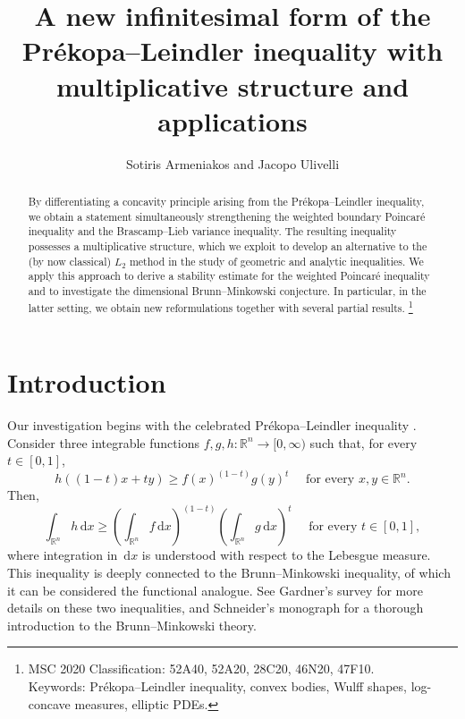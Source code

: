 \documentclass[a4paper, 11pt]{article}
\title{A new infinitesimal form of the Pr\'ekopa--Leindler inequality with multiplicative structure and applications}
\author{Sotiris Armeniakos and Jacopo Ulivelli}
\date{}
\newcommand{\R}{\mathbb{R}}
\theoremstyle{definition}
\newcommand{\di}{\, \mathrm{d}}
\newcommand\blfootnote[1]{%
	\begingroup
	\renewcommand\thefootnote{}\footnote{#1}%
	\addtocounter{footnote}{-1}%
	\endgroup
}
\begin{document}
	\maketitle
	
	\begin{abstract}
		By differentiating a concavity principle arising from the Prékopa--Leindler inequality, we obtain a statement simultaneously strengthening the weighted boundary Poincar\'e inequality and the Brascamp--Lieb variance inequality. The resulting inequality possesses a multiplicative structure, which we exploit to develop an alternative to the (by now classical) $L_2$ method in the study of geometric and analytic inequalities. We apply this approach to derive a stability estimate for the weighted Poincar\'e inequality and to investigate the dimensional Brunn--Minkowski conjecture. In particular, in the latter setting, we obtain new reformulations together with several partial results.
		\blfootnote{
			MSC 2020 Classification: 52A40, 52A20, 28C20, 46N20, 47F10.\\
			Keywords: Pr\'ekopa--Leindler inequality, convex bodies, Wulff shapes, log-concave measures, elliptic PDEs.}
	\end{abstract}

\section{Introduction}

Our investigation begins with the celebrated Pr\'ekopa--Leindler inequality \cite{Leindler, Prekopa}. Consider three integrable functions $f,g,h: \R^n \to [0,\infty)$ such that, for every $t \in [0,1]$, 
\begin{equation*}
    h((1-t)x+ty) \geq f(x)^{(1-t)}g(y)^t \quad \text{ for every } x,y \in \R^n.
\end{equation*}
Then, 
\begin{equation}\label{eq:PL_1}
    \int_{\R^n} h \di x \geq \left( \int_{\R^n} f \di x \right)^{(1-t)} \left( \int_{\R^n} g \di x \right)^t \quad \text{ for every } t \in [0,1],
\end{equation}
where integration in $\di x$ is understood with respect to the Lebesgue measure. This inequality is deeply connected to the Brunn--Minkowski inequality, of which it can be considered the functional analogue. See Gardner's survey \cite{Gardner_BM} for more details on these two inequalities, and Schneider's monograph \cite{SchneiderConvexBodiesBrunn2013} for a thorough introduction to the Brunn--Minkowski theory. 
\end{document}
